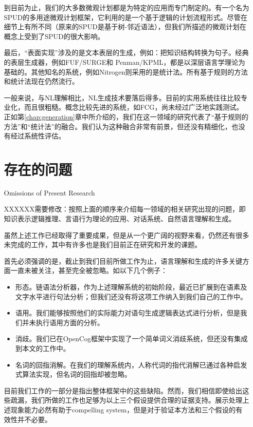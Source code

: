 \begin{enumerate}
到目前为止，我们的大多数微观计划都是为特定的应用而专门制定的。有一个名为SPUD\cite{Stone 1997}的多用途微观计划框架，它利用的是一个基于逻辑的计划流程形式。尽管在细节上有所不同（原来的SPUD是基于树-邻近语法），但我们所描述的微观计划在概念上受到了SPUD的很大影响。

最后，“表面实现”涉及的是文本表层的生成，例如：把知识结构转换为句子。经典的表层生成器，例如FUF/SURGE\cite{Elhadad1992}和 Penman/KPML\cite{Matthiessen1991}，都是以深层语言学理论为基础的。其他知名的系统，例如Nitrogen\cite{Langkilde1998}则采用的是统计法。所有基于规则的方法和统计法现在仍然流行。

一般来说，与NL理解相比，NL生成技术要落后得多。目前的实用系统往往比较专业化，而且很粗糙。概念比较先进的系统，如FCG，尚未经过广泛地实践测试。正如第\ref{chap:generation}章中所介绍的，我们在这一领域的研究代表了“基于规则的方法”和“统计法”的融合。我们认为这种融合非常有前景，但还没有精细化，也没有经过系统性评估。

\section{存在的问题}{Omissions of Present Research}

XXXXXX需要修改：按照上面的顺序来介绍每一领域的相关研究出现的问题，即知识表示逻辑推理、言语行为理论的应用、对话系统、自然语言理解和生成。

虽然上述工作已经取得了重要成果，但是从一个更广阔的视野来看，仍然还有很多未完成的工作，其中有许多也是我们目前正在研究和开发的课题。

首先必须强调的是，截止到我们目前所做工作为止，语言理解和生成的许多关键方面一直未被关注，甚至完全被忽略。如以下几个例子：
\begin{itemize}
\item 形态。链语法分析器，作为上述理解系统的初始阶段，最近已扩展到在语素及文字水平进行句法分析；但我们还没有将这项工作纳入到我们自己的工作中。
\item 语用。我们能够按照他们的实际能力对语句生成逻辑表达式进行分析，但是我们并未执行语用方面的分析。
\item 消歧。我们已在OpenCog框架中实现了一个简单词义消歧系统，但还没有集成到本文的工作中。
\item 名词的回指消解。在我们的理解系统内，人称代词的指代消解已通过各种启发式算法实现，但名词的回指却被忽略。
\end{itemize}

目前我们工作的一部分是指出整体框架中的这些缺陷。然而，我们相信即使给出这些疏漏，我们所做的工作也足够为以上三个假设提供合理的证据支持。展示处理上述现象能力必然有助于compelling system，但是对于验证本方法和三个假设的有效性并不必要。


\end{enumerate}
